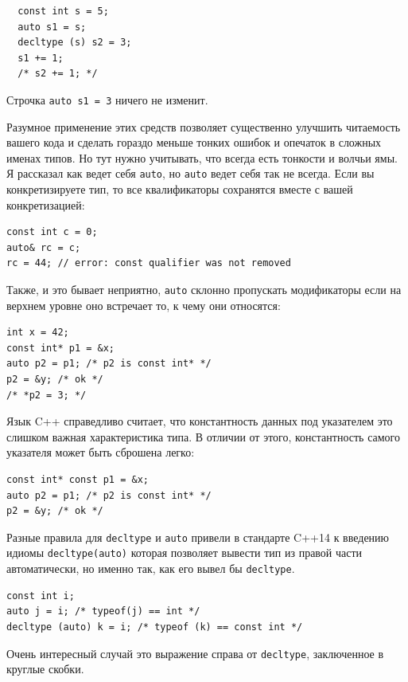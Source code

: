 \documentclass[a4paper,12pt,oneside]{article}
\begin{document}
\begin{lstlisting}
  const int s = 5;
  auto s1 = s;
  decltype (s) s2 = 3;
  s1 += 1;
  /* s2 += 1; */
\end{lstlisting}

Строчка \lstinline!auto s1 = 3! ничего не изменит.

Разумное применение этих средств позволяет существенно улучшить читаемость вашего кода и сделать гораздо меньше тонких ошибок и опечаток в сложных именах типов. Но тут нужно учитывать, что всегда есть тонкости и волчьи ямы. Я рассказал как ведет себя \lstinline!auto!, но \lstinline!auto! ведет себя так не всегда. Если вы конкретизируете тип, то все квалификаторы сохранятся вместе с вашей конкретизацией:

\begin{lstlisting}
const int c = 0;
auto& rc = c;
rc = 44; // error: const qualifier was not removed
\end{lstlisting}

Также, и это бывает неприятно, \lstinline!auto! склонно пропускать модификаторы если на верхнем уровне оно встречает то, к чему они относятся:

\begin{lstlisting}
int x = 42;
const int* p1 = &x;
auto p2 = p1; /* p2 is const int* */
p2 = &y; /* ok */
/* *p2 = 3; */
\end{lstlisting}

Язык C++ справедливо считает, что константность данных под указателем это слишком важная характеристика типа. В отличии от этого, константность самого указателя может быть сброшена легко:

\begin{lstlisting}
const int* const p1 = &x;
auto p2 = p1; /* p2 is const int* */
p2 = &y; /* ok */
\end{lstlisting}

Разные правила для \lstinline!decltype! и \lstinline!auto! привели в стандарте C++14 к введению идиомы \lstinline!decltype(auto)! которая позволяет вывести тип из правой части автоматически, но именно так, как его вывел бы \lstinline!decltype!.

\begin{lstlisting}
const int i;
auto j = i; /* typeof(j) == int */
decltype (auto) k = i; /* typeof (k) == const int */
\end{lstlisting}

Очень интересный случай это выражение справа от \lstinline!decltype!, заключенное в круглые скобки.
\end{document}
